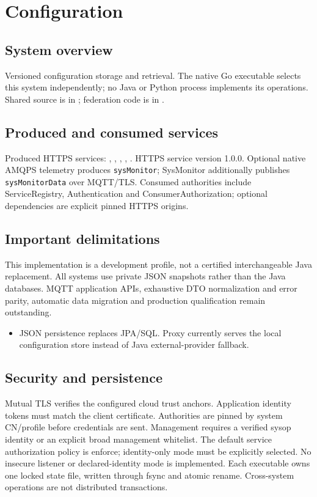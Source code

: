 \documentclass[a4paper]{arrowhead}
\begin{document}
\section{Configuration}
\subsection{System overview}
Versioned configuration storage and retrieval. The native Go executable selects this system independently; no Java or Python process implements its operations. Shared source is in ; federation code is in .
\subsection{Produced and consumed services}
Produced HTTPS services: , \allowbreak {}, \allowbreak {}, \allowbreak {}, \allowbreak {}.
HTTPS service version 1.0.0. Optional native AMQPS telemetry produces \texttt{sysMonitor}; SysMonitor additionally publishes \texttt{sysMonitorData} over MQTT/TLS. Consumed authorities include ServiceRegistry, Authentication and ConsumerAuthorization; optional dependencies are explicit pinned HTTPS origins.
\subsection{Important delimitations}
This implementation is a development profile, not a certified interchangeable Java replacement. All systems use private JSON snapshots rather than the Java databases. MQTT application APIs, exhaustive DTO normalization and error parity, automatic data migration and production qualification remain outstanding.
\begin{itemize}
\item JSON persistence replaces JPA/SQL. Proxy currently serves the local configuration store instead of Java external-provider fallback.
\end{itemize}
\subsection{Security and persistence}
Mutual TLS verifies the configured cloud trust anchors. Application identity tokens must match the client certificate. Authorities are pinned by system CN/profile before credentials are sent. Management requires a verified sysop identity or an explicit broad management whitelist. The default service authorization policy is enforce; identity-only mode must be explicitly selected. No insecure listener or declared-identity mode is implemented. Each executable owns one locked state file, written through fsync and atomic rename. Cross-system operations are not distributed transactions.
\clearpage
\end{document}
